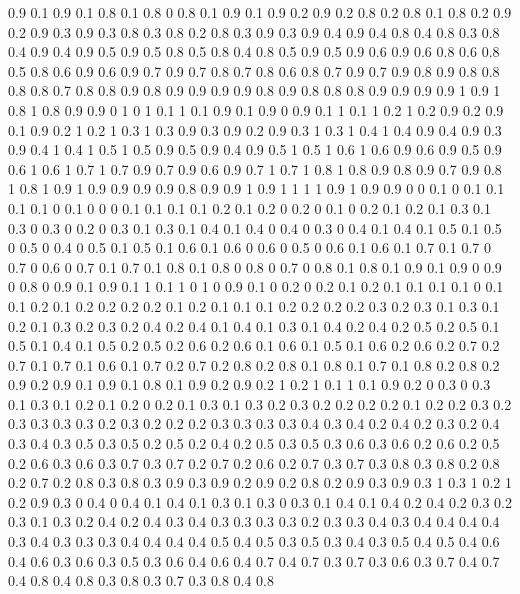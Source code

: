 0.9 0.1
0.9 0.1
0.8 0.1
0.8 0
0.8 0.1
0.9 0.1
0.9 0.2
0.9 0.2
0.8 0.2
0.8 0.1
0.8 0.2
0.9 0.2
0.9 0.3
0.9 0.3
0.8 0.3
0.8 0.2
0.8 0.3
0.9 0.3
0.9 0.4
0.9 0.4
0.8 0.4
0.8 0.3
0.8 0.4
0.9 0.4
0.9 0.5
0.9 0.5
0.8 0.5
0.8 0.4
0.8 0.5
0.9 0.5
0.9 0.6
0.9 0.6
0.8 0.6
0.8 0.5
0.8 0.6
0.9 0.6
0.9 0.7
0.9 0.7
0.8 0.7
0.8 0.6
0.8 0.7
0.9 0.7
0.9 0.8
0.9 0.8
0.8 0.8
0.8 0.7
0.8 0.8
0.9 0.8
0.9 0.9
0.9 0.9
0.8 0.9
0.8 0.8
0.8 0.9
0.9 0.9
0.9 1
0.9 1
0.8 1
0.8 0.9
0.9 0
1 0
1 0.1
1 0.1
0.9 0.1
0.9 0
0.9 0.1
1 0.1
1 0.2
1 0.2
0.9 0.2
0.9 0.1
0.9 0.2
1 0.2
1 0.3
1 0.3
0.9 0.3
0.9 0.2
0.9 0.3
1 0.3
1 0.4
1 0.4
0.9 0.4
0.9 0.3
0.9 0.4
1 0.4
1 0.5
1 0.5
0.9 0.5
0.9 0.4
0.9 0.5
1 0.5
1 0.6
1 0.6
0.9 0.6
0.9 0.5
0.9 0.6
1 0.6
1 0.7
1 0.7
0.9 0.7
0.9 0.6
0.9 0.7
1 0.7
1 0.8
1 0.8
0.9 0.8
0.9 0.7
0.9 0.8
1 0.8
1 0.9
1 0.9
0.9 0.9
0.9 0.8
0.9 0.9
1 0.9
1 1
1 1
0.9 1
0.9 0.9
0 0
0.1 0
0.1 0.1
0.1 0.1
0 0.1
0 0
0 0.1
0.1 0.1
0.1 0.2
0.1 0.2
0 0.2
0 0.1
0 0.2
0.1 0.2
0.1 0.3
0.1 0.3
0 0.3
0 0.2
0 0.3
0.1 0.3
0.1 0.4
0.1 0.4
0 0.4
0 0.3
0 0.4
0.1 0.4
0.1 0.5
0.1 0.5
0 0.5
0 0.4
0 0.5
0.1 0.5
0.1 0.6
0.1 0.6
0 0.6
0 0.5
0 0.6
0.1 0.6
0.1 0.7
0.1 0.7
0 0.7
0 0.6
0 0.7
0.1 0.7
0.1 0.8
0.1 0.8
0 0.8
0 0.7
0 0.8
0.1 0.8
0.1 0.9
0.1 0.9
0 0.9
0 0.8
0 0.9
0.1 0.9
0.1 1
0.1 1
0 1
0 0.9
0.1 0
0.2 0
0.2 0.1
0.2 0.1
0.1 0.1
0.1 0
0.1 0.1
0.2 0.1
0.2 0.2
0.2 0.2
0.1 0.2
0.1 0.1
0.1 0.2
0.2 0.2
0.2 0.3
0.2 0.3
0.1 0.3
0.1 0.2
0.1 0.3
0.2 0.3
0.2 0.4
0.2 0.4
0.1 0.4
0.1 0.3
0.1 0.4
0.2 0.4
0.2 0.5
0.2 0.5
0.1 0.5
0.1 0.4
0.1 0.5
0.2 0.5
0.2 0.6
0.2 0.6
0.1 0.6
0.1 0.5
0.1 0.6
0.2 0.6
0.2 0.7
0.2 0.7
0.1 0.7
0.1 0.6
0.1 0.7
0.2 0.7
0.2 0.8
0.2 0.8
0.1 0.8
0.1 0.7
0.1 0.8
0.2 0.8
0.2 0.9
0.2 0.9
0.1 0.9
0.1 0.8
0.1 0.9
0.2 0.9
0.2 1
0.2 1
0.1 1
0.1 0.9
0.2 0
0.3 0
0.3 0.1
0.3 0.1
0.2 0.1
0.2 0
0.2 0.1
0.3 0.1
0.3 0.2
0.3 0.2
0.2 0.2
0.2 0.1
0.2 0.2
0.3 0.2
0.3 0.3
0.3 0.3
0.2 0.3
0.2 0.2
0.2 0.3
0.3 0.3
0.3 0.4
0.3 0.4
0.2 0.4
0.2 0.3
0.2 0.4
0.3 0.4
0.3 0.5
0.3 0.5
0.2 0.5
0.2 0.4
0.2 0.5
0.3 0.5
0.3 0.6
0.3 0.6
0.2 0.6
0.2 0.5
0.2 0.6
0.3 0.6
0.3 0.7
0.3 0.7
0.2 0.7
0.2 0.6
0.2 0.7
0.3 0.7
0.3 0.8
0.3 0.8
0.2 0.8
0.2 0.7
0.2 0.8
0.3 0.8
0.3 0.9
0.3 0.9
0.2 0.9
0.2 0.8
0.2 0.9
0.3 0.9
0.3 1
0.3 1
0.2 1
0.2 0.9
0.3 0
0.4 0
0.4 0.1
0.4 0.1
0.3 0.1
0.3 0
0.3 0.1
0.4 0.1
0.4 0.2
0.4 0.2
0.3 0.2
0.3 0.1
0.3 0.2
0.4 0.2
0.4 0.3
0.4 0.3
0.3 0.3
0.3 0.2
0.3 0.3
0.4 0.3
0.4 0.4
0.4 0.4
0.3 0.4
0.3 0.3
0.3 0.4
0.4 0.4
0.4 0.5
0.4 0.5
0.3 0.5
0.3 0.4
0.3 0.5
0.4 0.5
0.4 0.6
0.4 0.6
0.3 0.6
0.3 0.5
0.3 0.6
0.4 0.6
0.4 0.7
0.4 0.7
0.3 0.7
0.3 0.6
0.3 0.7
0.4 0.7
0.4 0.8
0.4 0.8
0.3 0.8
0.3 0.7
0.3 0.8
0.4 0.8
